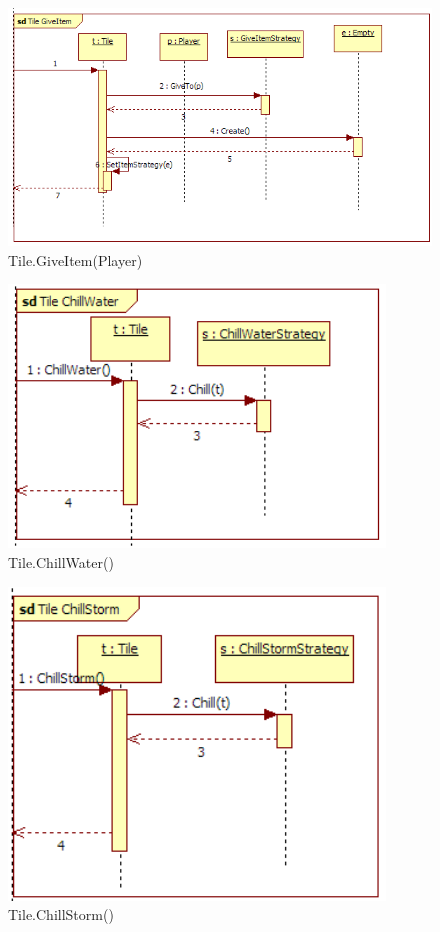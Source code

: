 \begin{figure}[H]
	\begin{center}
		\includegraphics[width=14cm]{chapters/chapter03/seqdiag/Tile_GiveItem.png}
		\caption{Tile.GiveItem(Player)}
		\label{fig:TileGiveItem}
	\end{center}
\end{figure}
\begin{figure}[H]
	\begin{center}
		\includegraphics[width=10cm]{chapters/chapter03/seqdiag/Tile_ChillWater.png}
		\caption{Tile.ChillWater()}
		\label{fig:TileChillWater}
	\end{center}
\end{figure}
\begin{figure}[H]
	\begin{center}
		\includegraphics[width=10cm]{chapters/chapter03/seqdiag/Tile_ChillStorm.png}
		\caption{Tile.ChillStorm()}
		\label{fig:TileChillStorm}
	\end{center}
\end{figure}
